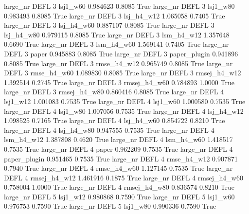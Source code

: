   large_nr     DEFL                 3     lsj1_w60    0.984623      0.8085    True
  large_nr     DEFL                 3     lsj1_w80    0.983493      0.8085    True
  large_nr     DEFL                 3   lsj_h4_w12    1.065058      0.7405    True
  large_nr     DEFL                 3   lsj_h4_w60    0.887107      0.8085    True
  large_nr     DEFL                 3   lsj_h4_w80    0.979115      0.8085    True
  large_nr     DEFL                 3   lsm_h4_w12    1.357648      0.6690    True
  large_nr     DEFL                 3   lsm_h4_w60    1.569141      0.7405    True
  large_nr     DEFL                 3        paper    0.945883      0.8085    True
  large_nr     DEFL                 3 paper_plugin    0.941896      0.8085    True
  large_nr     DEFL                 3  rmse_h4_w12    0.965749      0.8085    True
  large_nr     DEFL                 3  rmse_h4_w60    1.089830      0.8085    True
  large_nr     DEFL                 3 rmsej_h4_w12    1.392514      0.2745    True
  large_nr     DEFL                 3 rmsej_h4_w60    0.784893      1.0000    True
  large_nr     DEFL                 3 rmsej_h4_w80    0.860416      0.8085    True
  large_nr     DEFL                 4     lsj1_w12    1.001083      0.7535    True
  large_nr     DEFL                 4     lsj1_w60    1.000580      0.7535    True
  large_nr     DEFL                 4     lsj1_w80    1.007056      0.7535    True
  large_nr     DEFL                 4   lsj_h4_w12    1.098525      0.7165    True
  large_nr     DEFL                 4   lsj_h4_w60    0.854722      0.8210    True
  large_nr     DEFL                 4   lsj_h4_w80    0.947555      0.7535    True
  large_nr     DEFL                 4   lsm_h4_w12    1.387808      0.4620    True
  large_nr     DEFL                 4   lsm_h4_w60    1.418517      0.7535    True
  large_nr     DEFL                 4        paper    0.962209      0.7535    True
  large_nr     DEFL                 4 paper_plugin    0.951465      0.7535    True
  large_nr     DEFL                 4  rmse_h4_w12    0.907871      0.7940    True
  large_nr     DEFL                 4  rmse_h4_w60    1.127145      0.7535    True
  large_nr     DEFL                 4 rmsej_h4_w12    1.461916      0.1875    True
  large_nr     DEFL                 4 rmsej_h4_w60    0.758004      1.0000    True
  large_nr     DEFL                 4 rmsej_h4_w80    0.836574      0.8210    True
  large_nr     DEFL                 5     lsj1_w12    0.980868      0.7590    True
  large_nr     DEFL                 5     lsj1_w60    0.976753      0.7590    True
  large_nr     DEFL                 5     lsj1_w80    0.990336      0.7590    True
